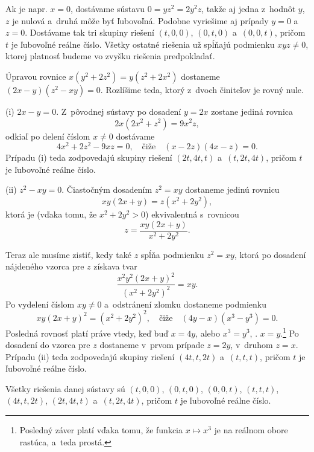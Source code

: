 {%
Ak je napr. $x=0$, dostávame sústavu $0=yz^2=2y^2z$, takže aj jedna
z~hodnôt $y$, $z$ je nulová a~druhá môže byť ľubovoľná. Podobne
vyriešime aj prípady $y=0$ a~$z=0$. Dostávame tak tri skupiny
riešení $(t,0,0)$, $(0,t,0)$ a~$(0,0,t)$, pričom $t$ je ľubovoľné reálne číslo.
Všetky ostatné riešenia už spĺňajú podmienku $xyz\ne0$, ktorej platnosť
budeme vo zvyšku riešenia predpokladať.

Úpravou rovnice
$x(y^2+2z^2)=y(z^2+2x^2)$ dostaneme
$(2x-y)(z^2-xy)=0$. Rozlíšime teda, ktorý z~dvoch činiteľov je
rovný nule.

(i) $2x-y=0$. Z~pôvodnej sústavy po dosadení $y=2x$ zostane jediná rovnica
$$
2x(2x^2+z^2)=9x^2z,
$$
odkiaľ po delení číslom $x\ne0$ dostávame %
$$
4x^2+2z^2-9xz=0,\quad\text{čiže}\quad (x-2z)(4x-z)=0.
$$
Prípadu (i) teda zodpovedajú skupiny riešení $(2t,4t,t)$ a~$(t,2t,4t)$,
pričom $t$ je ľubovoľné reálne číslo.

(ii) $z^2-xy=0$. Čiastočným dosadením $z^2=xy$ dostaneme jedinú rovnicu
$$
xy(2x+y)=z(x^2+2y^2),
$$
ktorá je (vďaka tomu, že $x^2+2y^2>0$) ekvivalentná s~rovnicou
$$
z=\frac{xy(2x+y)}{x^2+2y^2}.
$$

Teraz ale musíme zistiť, kedy také $z$ spĺňa podmienku
$z^2=xy$, ktorá po dosadení nájdeného vzorca pre $z$ získava tvar
$$
\frac{x^2y^2(2x+y)^2}{(x^2+2y^2)^2}=xy.
$$
Po vydelení číslom $xy\ne0$ a~odstránení zlomku dostaneme podmienku
$$
xy(2x+y)^2=(x^2+2y^2)^2,\quad\text{čiže}\quad
(4y-x)(x^3-y^3)=0.
$$
Posledná rovnosť platí práve vtedy, keď buď $x=4y$, alebo $x^3=y^3$, \tj.
$x=y$.\footnote{Posledný záver platí vďaka tomu, že funkcia
$x\mapsto x^3$ je na reálnom obore rastúca, a~teda prostá.}
Po dosadení do vzorca pre $z$ dostaneme v~prvom prípade $z=2y$,
v~druhom $z=x$. Prípadu (ii) teda zodpovedajú skupiny riešení
$(4t,t,2t)$ a~$(t,t,t)$, pričom $t$ je ľubovoľné reálne číslo.

\odpoved
Všetky riešenia danej sústavy sú $(t,0,0)$, $(0,t,0)$, $(0,0,t)$,
$(t,t,t)$, $(4t,t,2t)$, $(2t,4t,t)$ a~$(t,2t,4t)$, pričom $t$ je ľubovoľné reálne číslo.

}
